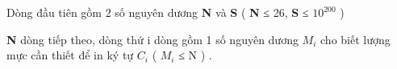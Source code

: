 Dòng đầu tiên gồm 2 số nguyên dương   \textbf{    N   }   và   \textbf{    S   }   (   \textbf{    N   }   ≤ 26,   \textbf{    S   }   ≤ $10^{200}$   )  

\textbf{    N   }   dòng tiếp theo, dòng thứ i dòng gồm 1 số nguyên dương $M_{i}$   cho biết lượng mực cần thiết để in ký tự $C_{i}$   ( $M_{i}$   ≤ N ) .